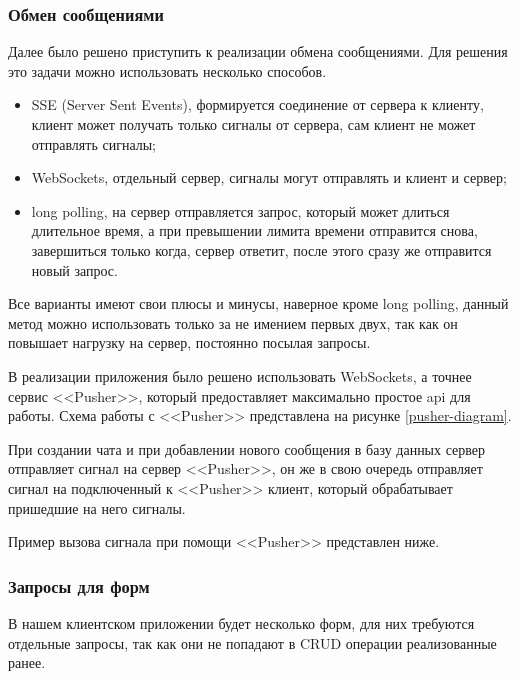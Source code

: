\subsubsection{Обмен сообщениями}

Далее было решено приступить к реализации обмена сообщениями. Для решения это задачи можно использовать несколько способов.

\begin{itemize}
    \item SSE (Server Sent Events), формируется соединение от сервера к клиенту, клиент может получать только сигналы от сервера, сам клиент не может отправлять сигналы;
    \item WebSockets, отдельный сервер, сигналы могут отправлять и клиент и сервер;
    \item long polling, на сервер отправляется запрос, который может длиться длительное время, а при превышении лимита времени отправится снова, завершиться только когда, сервер ответит, после этого сразу же отправится новый запрос.
\end{itemize}

Все варианты имеют свои плюсы и минусы, наверное кроме long polling, данный  метод можно использовать только за не имением первых двух, так как он повышает нагрузку на сервер, постоянно посылая запросы.

В реализации приложения было решено использовать WebSockets, а точнее сервис <<Pusher>>, который предоставляет максимально простое api для работы. Схема работы с <<Pusher>> представлена на рисунке \ref{pusher-diagram}.


При создании чата и при добавлении нового сообщения в базу данных сервер отправляет сигнал на сервер <<Pusher>>, он же в свою очередь отправляет сигнал на подключенный к <<Pusher>> клиент, который обрабатывает пришедшие на него сигналы.

Пример вызова сигнала при помощи <<Pusher>> представлен ниже.


\subsubsection{Запросы для форм}

В нашем клиентском приложении будет несколько форм, для них требуются отдельные запросы, так как они не попадают в CRUD операции реализованные ранее.

